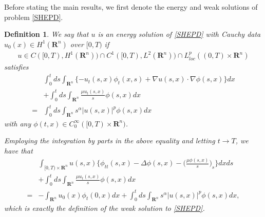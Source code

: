 \documentclass[review]{elsarticle}
\newtheorem{defn}[thm]{Definition}
\newcommand{\R}{\mathbf{R}}
\begin{document}
Before stating the main results, we first denote the energy and weak solutions of problem \eqref{SHEPD}.
\begin{defn}
We say that $u$ is an energy solution of \eqref{SHEPD} with Cauchy data $u_0(x)\in H^1(\R^n)$ over $[0,T)$ if
\begin{equation}
\begin{aligned}
u\in C([0,T),H^1(\R^n))\cap C^1([0,T),L^2(\R^n))\cap L^p_{loc}((0, T)\times\R^n)
\end{aligned}
\end{equation}
satisfies
\begin{equation}
\begin{aligned}
&\int_{0}^{t}ds\int_{\R^n}\{-u_t(s, x)\phi_t(x,s)+\nabla u(s, x)\cdot \nabla \phi(s, x)\}dx\\
&+\int_{0}^{t}ds\int_{\R^n} \frac{\mu u_t(s, x)}{s}\phi(s, x)dx\\
=&\int_{0}^{t}ds\int_{\R^n}s^\alpha|u(s, x)|^p\phi(s, x)dx
\end{aligned}
\end{equation}
with any $\phi(t, x)\in C_0^\infty([0, T)\times\R^n)$.

Employing the integration by parts in the above equality and letting $t\rightarrow T$, we have that
\begin{equation}
\begin{aligned}
&\int_{[0, T)\times\R^n}u(s, x)\bigg\{\phi_{tt}(s, x)-\Delta \phi(s, x)-\Big(\frac{\mu\phi(s, x)}{s}\Big)_s\bigg\}dxds\\
&+\int_{0}^{t}ds\int_{\R^n} \frac{\mu u_t(s, x)}{s}\phi(s, x)dx\\
=&-\int_{\R^n}u_0(x)\phi_t(0, x)dx+\int_{0}^{t}ds\int_{\R^n}s^\alpha|u(s, x)|^p\phi(s, x)dx,
\end{aligned}
\end{equation}
which is exactly the definition of the weak solution to \eqref{SHEPD}.
\end{defn}
\end{document}
